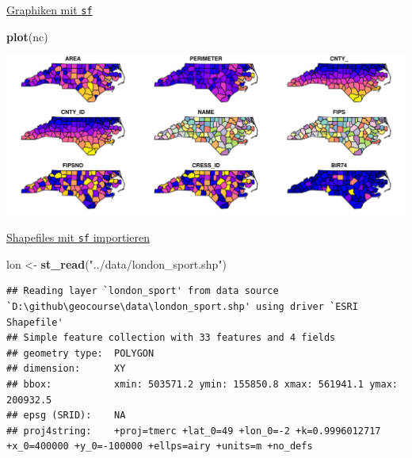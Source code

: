 \documentclass[ignorenonframetext,]{beamer}
\newenvironment{Shaded}{\begin{snugshade}}{\end{snugshade}}
\newcommand{\KeywordTok}[1]{\textcolor[rgb]{0.13,0.29,0.53}{\textbf{#1}}}
\newcommand{\NormalTok}[1]{#1}
\newcommand{\StringTok}[1]{\textcolor[rgb]{0.31,0.60,0.02}{#1}}
\begin{document}
\begin{frame}[fragile]{\href{https://r-spatial.github.io/sf/articles/sf5.html}{Graphiken
mit \texttt{sf}}}
\protect\hypertarget{graphiken-mit-sf}{}

\begin{Shaded}
\begin{Highlighting}[]
\KeywordTok{plot}\NormalTok{(nc)}
\end{Highlighting}
\end{Shaded}

\includegraphics{B7_simplefeatures_files/figure-beamer/unnamed-chunk-12-1.pdf}

\end{frame}

\begin{frame}[fragile]{\href{https://cran.r-project.org/web/packages/sf/vignettes/sf2.html}{Shapefiles
mit \texttt{sf} importieren}}
\protect\hypertarget{shapefiles-mit-sf-importieren}{}

\begin{Shaded}
\begin{Highlighting}[]
\NormalTok{lon <-}\StringTok{ }\KeywordTok{st_read}\NormalTok{(}\StringTok{"../data/london_sport.shp"}\NormalTok{)}
\end{Highlighting}
\end{Shaded}

\begin{verbatim}
## Reading layer `london_sport' from data source `D:\github\geocourse\data\london_sport.shp' using driver `ESRI Shapefile'
## Simple feature collection with 33 features and 4 fields
## geometry type:  POLYGON
## dimension:      XY
## bbox:           xmin: 503571.2 ymin: 155850.8 xmax: 561941.1 ymax: 200932.5
## epsg (SRID):    NA
## proj4string:    +proj=tmerc +lat_0=49 +lon_0=-2 +k=0.9996012717 +x_0=400000 +y_0=-100000 +ellps=airy +units=m +no_defs
\end{verbatim}

\end{frame}
\end{document}
